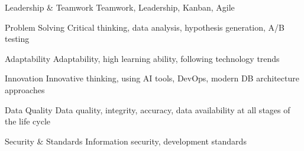 

\begin{cvskills}

  \cvskill
    {Leadership \& Teamwork} %
    {Teamwork, Leadership, Kanban, Agile} %

  \cvskill
    {Problem Solving} %
    {Critical thinking, data analysis, hypothesis generation, A/B testing} %

  \cvskill
    {Adaptability} %
    {Adaptability, high learning ability, following technology trends} %

  \cvskill
    {Innovation} %
    {Innovative thinking, using AI tools, DevOps, modern DB architecture approaches} %

  \cvskill
    {Data Quality} %
    {Data quality, integrity, accuracy, data availability at all stages of the life cycle} %

  \cvskill
    {Security \& Standards} %
    {Information security, development standards} %

\end{cvskills}